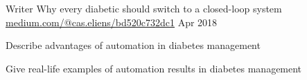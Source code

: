 

\begin{cventries}

  \cventry
    {Writer} %
    {Why every diabetic should switch to a closed-loop system} %
    {\href{https://medium.com/@cas.eliens/bd520c732dc1}{medium.com/@cas.eliens/bd520c732dc1}} %
    {Apr 2018} %
    {
      \begin{cvitems} %
        \item {Describe advantages of automation in diabetes management}
        \item {Give real-life examples of automation results in diabetes management}
      \end{cvitems}
    }

\end{cventries}
